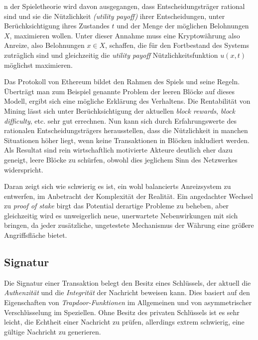 \documentclass[runningheads]{llncs}
\begin{document}
n der Spieletheorie wird davon ausgegangen, dass Entscheidungsträger rational sind und sie die Nützlichkeit \textit{(utility payoff)} ihrer Entscheidungen, unter Berüchksichtigung ihres Zustandes $ t $ und der Menge der möglichen Belohnungen $ X $,  maximieren wollen. Unter dieser Annahme muss eine Kryptowährung also Anreize, also Belohnungen $ x \in X $, schaffen, die für den Fortbestand des Systems zuträglich sind und gleichzeitig die \textit{utility payoff} Nützlichkeitsfunktion $ u(x, t) $ möglichst maximieren.  \cite[S. 2 ff.]{myerson_game_1997}

Das Protokoll von Ethereum bildet den Rahmen des Spiels und seine Regeln. Überträgt man zum Beispiel genannte Problem der leeren Blöcke auf dieses Modell, ergibt sich eine mögliche Erklärung des Verhaltens. Die Rentabilität von Mining lässt sich unter Berüchksichtigung der aktuellen \textit{block rewards}, \textit{block difficulty}, etc. sehr gut errechnen. \cite{noauthor_ethereum_nodate} Nun kann sich durch Erfahrungswerte des rationalen Entscheidungsträgers herausstellen, dass die Nützlichkeit in manchen Situationen höher liegt, wenn keine Transaktionen in Blöcken inkludiert werden. Als Resultat sind rein wirtschaftlich motivierte Akteure deutlich eher dazu geneigt, leere Blöcke zu schürfen, obwohl dies jeglichem Sinn des Netzwerkes widerspricht.

Daran zeigt sich wie schwierig es ist, ein wohl balancierts Anreizsystem zu entwerfen, im Anbetracht der Komplexität der Realität. Ein angedachter Wechsel zu \textit{proof of stake} birgt das Potential derartige Probleme zu beheben, aber gleichzeitig wird es unweigerlich neue, unerwartete Nebenwirkungen mit sich bringen, da jeder zusätzliche, ungetestete Mechanismus der Währung eine größere Angriffsfläche bietet. \cite{noauthor_ethereum/wiki_pos_nodate}

\subsection{Signatur}
Die Signatur einer Transaktion belegt den Besitz eines Schlüssels, der aktuell die \textit{Authenzität} und die \textit{Integrität} der Nachricht beweisen kann. Dies basiert auf den Eigenschaften von \textit{Trapdoor-Funktionen} im Allgemeinen und von asymmetrischer Verschlüsselung im Speziellen. Ohne Besitz des privaten Schlüssels ist es sehr leicht, die Echtheit einer Nachricht zu prüfen, allerdings extrem schwierig, eine gültige Nachricht zu generieren. \cite{roeder_asymmetric-key_nodate}
\end{document}
